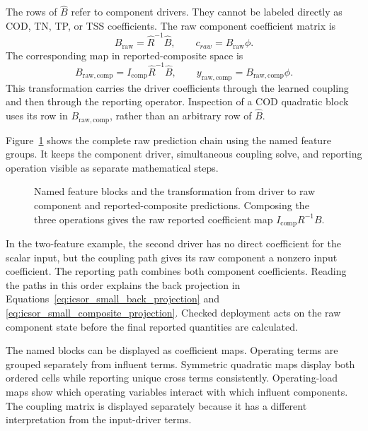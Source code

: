 The rows of \(\widehat B\) refer to component drivers. They cannot be labeled directly as COD, TN, TP, or TSS coefficients. The raw component coefficient matrix is
\begin{equation}
\label{eq:icsor_raw_component_coefficients}
B_{\mathrm{raw}}=\widehat R^{-1}\widehat B,
\qquad c_{raw}=B_{\mathrm{raw}}\phi.
\end{equation}
The corresponding map in reported-composite space is
\begin{equation}
\label{eq:icsor_raw_composite_coefficients}
B_{\mathrm{raw,comp}}=I_{\mathrm{comp}}\widehat R^{-1}\widehat B,
\qquad y_{\mathrm{raw,comp}}=B_{\mathrm{raw,comp}}\phi.
\end{equation}
This transformation carries the driver coefficients through the learned coupling and then through the reporting operator. Inspection of a COD quadratic block uses its row in \(B_{\mathrm{raw,comp}}\), rather than an arbitrary row of \(\widehat B\).

Figure~\ref{fig:ch5_prediction_chain} shows the complete raw prediction chain using the named feature groups. It keeps the component driver, simultaneous coupling solve, and reporting operation visible as separate mathematical steps.

\begin{figure}[htbp]
\centering

\caption{Named feature blocks and the transformation from driver to raw component and reported-composite predictions. Composing the three operations gives the raw reported coefficient map \(I_{\mathrm{comp}}R^{-1}B\).}
\label{fig:ch5_prediction_chain}
\end{figure}

In the two-feature example, the second driver has no direct coefficient for the scalar input, but the coupling path gives its raw component a nonzero input coefficient. The reporting path combines both component coefficients. Reading the paths in this order explains the back projection in Equations~\eqref{eq:icsor_small_back_projection} and \eqref{eq:icsor_small_composite_projection}. Checked deployment acts on the raw component state before the final reported quantities are calculated.

The named blocks can be displayed as coefficient maps. Operating terms are grouped separately from influent terms. Symmetric quadratic maps display both ordered cells while reporting unique cross terms consistently. Operating-load maps show which operating variables interact with which influent components. The coupling matrix is displayed separately because it has a different interpretation from the input-driver terms.

